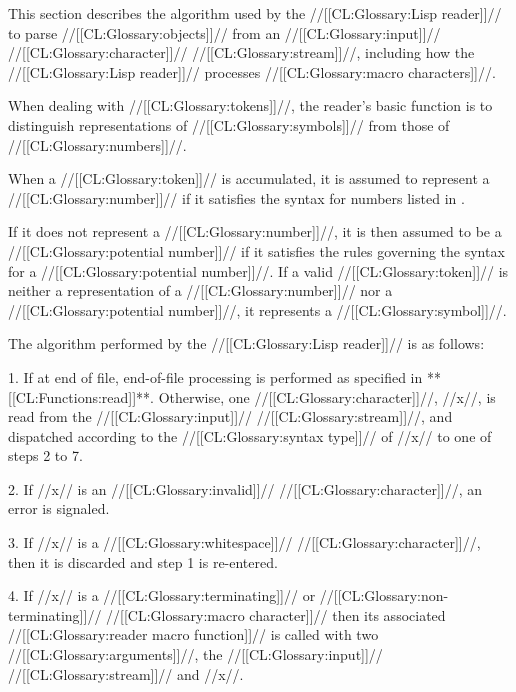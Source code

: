 

This section describes the algorithm used by the //[[CL:Glossary:Lisp reader]]// to parse //[[CL:Glossary:objects]]// from an //[[CL:Glossary:input]]// //[[CL:Glossary:character]]// //[[CL:Glossary:stream]]//, including how the //[[CL:Glossary:Lisp reader]]// processes //[[CL:Glossary:macro characters]]//.

When dealing with //[[CL:Glossary:tokens]]//, the reader's basic function is to distinguish representations of //[[CL:Glossary:symbols]]// from those of //[[CL:Glossary:numbers]]//.

When a //[[CL:Glossary:token]]// is accumulated, it is assumed to represent a //[[CL:Glossary:number]]// if it satisfies the syntax for numbers listed in \figref\SyntaxForNumericTokens.

If it does not represent a //[[CL:Glossary:number]]//, it is then assumed to be a //[[CL:Glossary:potential number]]//  if it satisfies the rules governing the syntax for a //[[CL:Glossary:potential number]]//. If a valid //[[CL:Glossary:token]]// is neither a representation of a //[[CL:Glossary:number]]//  			       nor a //[[CL:Glossary:potential number]]//, it represents a //[[CL:Glossary:symbol]]//.

The algorithm performed by the //[[CL:Glossary:Lisp reader]]// is as follows:

\beginlist \item{1.}             If at end of file, end-of-file processing is performed as specified in **[[CL:Functions:read]]**. Otherwise, one //[[CL:Glossary:character]]//, //x//,  is read from the //[[CL:Glossary:input]]// //[[CL:Glossary:stream]]//, and dispatched according to the //[[CL:Glossary:syntax type]]// of //x// to one of steps 2 to 7.

\item{2.}                                           If //x// is an //[[CL:Glossary:invalid]]// //[[CL:Glossary:character]]//, an error  is signaled.

\item{3.} If //x// is a //[[CL:Glossary:whitespace]]// //[[CL:Glossary:character]]//, then it is discarded and step 1 is re-entered.

\item{4.} If //x// is a //[[CL:Glossary:terminating]]// or //[[CL:Glossary:non-terminating]]// //[[CL:Glossary:macro character]]// then its associated //[[CL:Glossary:reader macro function]]// is called with two //[[CL:Glossary:arguments]]//, the //[[CL:Glossary:input]]// //[[CL:Glossary:stream]]// and //x//.


